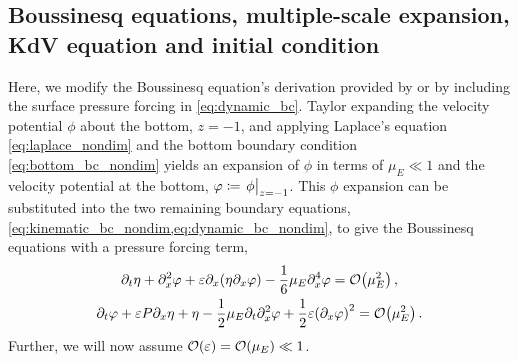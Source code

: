 \documentclass{jfm}
\renewcommand*{\epsilon}{\varepsilon}
\begin{document}
\subsection{\label{sec:boussinesq} Boussinesq equations, multiple-scale
expansion, KdV equation and initial condition}
Here, we modify the Boussinesq equation's derivation provided by
\citet{mei2005nonlinear} or \citet{ablowitz2011nonlinear} by including
the surface pressure forcing in \cref{eq:dynamic_bc}.
Taylor expanding the velocity potential $\phi$ about the bottom,
$z=-1$, and applying Laplace's
equation \cref{eq:laplace_nondim} and the bottom boundary
condition \cref{eq:bottom_bc_nondim} yields an expansion of $\phi$ in
terms of $\mu_E \ll 1$ and the velocity potential at the bottom,
$\varphi \coloneqq \eval{\phi}_{z=-1}$.
This $\phi$ expansion can be substituted into the two remaining boundary
equations, \cref{eq:kinematic_bc_nondim,eq:dynamic_bc_nondim}, to give
the Boussinesq equations with a pressure forcing term,
\begin{gather}
  \partial_t \eta + \partial_x^2 \varphi + \epsilon \partial_x
    \pqty{\eta \partial_x \varphi} -\frac{1}{6}\mu_E \partial^4_x
    \varphi = \order{\mu_E^2} \label{eq:kinematic_bc_varphi} \,, \\
  \partial_t \varphi + \epsilon P \partial_x \eta + \eta -
    \frac{1}{2}\mu_E \partial_t \partial_x^2 \varphi +
    \frac{1}{2}\epsilon\pqty{\partial_x \varphi}^2 = \order{\mu_E^2} \,.
    \label{eq:dynamic_bc_varphi}
\end{gather}
Further, we will now assume $\order{\epsilon} = \order{\mu_E} \ll 1$.
\end{document}

